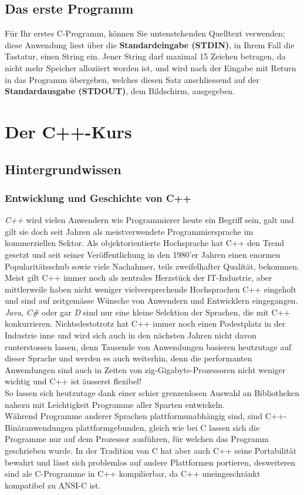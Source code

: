 \documentclass[b5paper,10pt,dvips,fleqn,titlepage,twoside]{book}
\begin{document}
\chapter{Das erste Programm}
Für Ihr erstes C-Programm, können Sie untenstehenden Quelltext verwenden; diese Anwendung liest über die \textbf{Standardeingabe (STDIN)}, in Ihrem Fall die Tastatur, einen String ein. Jener String darf maximal 15 Zeichen betragen, da nicht mehr Speicher alloziiert worden ist, und wird nach der Eingabe mit Return in das Programm übergeben, welches diesen Satz anschliessend auf der \textbf{Standardausgabe (STDOUT)}, dem Bildschirm, ausgegeben.
\newpage

\part{Der C++-Kurs}
\label{part:cpp}
\chapter{Hintergrundwissen}
\section{Entwicklung und Geschichte von C++}
\emph{C++} wird vielen Anwendern wie Programmierer heute ein Begriff sein, galt und gilt sie doch seit Jahren als meistverwendete Programmiersprache im kommerziellen Sektor. Als objektorientierte Hochsprache hat C++ den Trend gesetzt und seit seiner Veröffentlichung in den 1980'er Jahren einen enormen Popularitätsschub sowie viele Nachahmer, teils zweifelhafter Qualität, bekommen. Meist gilt C++ immer noch als zentrales Herzstück der IT-Industrie, aber mittlerweile haben nicht weniger vielversprechende Hochsprachen C++ eingeholt und sind auf zeitgemässe Wünsche von Anwendern und Entwicklern eingegangen. \emph{Java}, \emph{C\#} oder gar \emph{D} sind nur eine kleine Selektion der Sprachen, die mit C++ konkurrieren. Nichtsdestotrotz hat C++ immer noch einen Podestplatz in der Industrie inne und wird sich auch in den nächsten Jahren nicht davon runterstossen lassen, denn Tausende von Anwendungen basieren heutzutage auf dieser Sprache und werden es auch weiterhin, denn die performanten Anwendungen sind auch in Zeiten von zig-Gigabyte-Prozessoren nicht weniger wichtig und C++ ist äusserst flexibel!\\
So lassen sich heutzutage dank einer schier grenzenlosen Auswahl an Bibliotheken nahezu mit Leichtigkeit Programme aller Sparten entwickeln.\\
Während Programme anderer Sprachen plattformunabhängig sind, sind C++-Binäranwendungen plattformgebunden, gleich wie bei C lassen sich die Programme nur auf dem Prozessor ausführen, für welchen das Programm geschrieben wurde. In der Tradition von C hat aber auch C++ seine Portabilität bewahrt und lässt sich problemlos auf andere Plattformen portieren, desweiteren sind ale C-Programme in C++ kompilierbar, da C++ uneingeschränkt kompatibel zu ANSI-C ist.
\newpage
\end{document}
